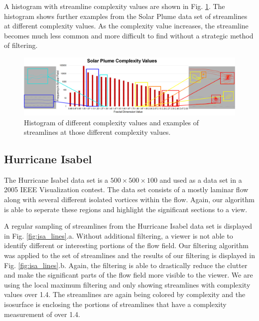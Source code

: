 \documentclass{egpubl}
\begin{document}
A histogram with streamline complexity values are shown in Fig. \ref{fig:histogram}.
The histogram shows further examples from the Solar Plume data set of streamlines at different complexity values.
As the complexity value increases, the streamline becomes much less common and more difficult to find without a strategic method of filtering.


\begin{figure}[t]
        \centering
                \begin{minipage}{0.99\linewidth}
                        \centering \small
                        \includegraphics[height = .27\linewidth]{Images/histogram.png}
                \end{minipage}
        \caption{Histogram of different complexity values and examples of streamlines at those different complexity values.}
        \label{fig:histogram}
\end{figure}

\subsection{Hurricane Isabel}

The Hurricane Isabel data set is a $500 \times 500 \times 100$ and used as a data set in a 2005 IEEE Visualization contest.
The data set consists of a mostly laminar flow along with several different isolated vortices within the flow.
Again, our algorithm is able to seperate these regions and highlight the significant sections to a view.

A regular sampling of streamlines from the Hurricane Isabel data set is displayed in Fig. \ref{fig:isa_lines}.a.
Without additional filtering, a viewer is not able to identify different or interesting portions of the flow field.
Our filtering algorithm was applied to the set of streamlines and the results of our filtering is displayed in Fig. \ref{fig:isa_lines}.b.
Again, the filtering is able to drastically reduce the clutter and make the significant parts of the flow field more visible to the viewer.
We are using the local maximum filtering and only showing streamlines with complexity values over 1.4.
The streamlines are again being colored by complexity and the isosurface is enclosing the portions of streamlines that have a complexity measurement of over 1.4.
\end{document}
